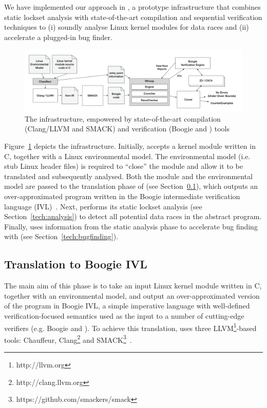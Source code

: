 We have implemented our approach in \whoop, a prototype infrastructure that combines static lockset analysis with state-of-the-art compilation and sequential verification techniques to (i) soundly analyse Linux kernel modules for data races and (ii) accelerate a plugged-in bug finder.

\begin{figure}
\centering
\includegraphics[width=.99\linewidth]{img/whoop.pdf}
\caption{The \whoop infrastructure, empowered by state-of-the-art compilation (Clang/LLVM and SMACK) and verification (Boogie and \corral) tools}
\label{fig:whoop}
\end{figure}

Figure~\ref{fig:whoop} depicts the \whoop infrastructure. Initially, \whoop accepts a kernel module written in C, together with a Linux environmental model. The environmental model (i.e. stub Linux header files) is required to ``close'' the module and allow it to be translated and subsequently analysed. Both the module and the environmental model are passed to the translation phase of \whoop (see Section~\ref{tech:translation}), which outputs an over-approximated program written in the Boogie intermediate verification language (IVL)~\cite{deline2005boogiepl}. Next, \whoop performs its static lockset analysis (see Section~\ref{tech:analysis}) to detect all potential data races in the abstract program. Finally, \whoop uses information from the static analysis phase to accelerate bug finding with \corral (see Section~\ref{tech:bugfinding}).

\subsection{Translation to Boogie IVL}
\label{tech:translation}

The main aim of this phase is to take an input Linux kernel module written in C, together with an environmental model, and output an over-approximated version of the program in Boogie IVL, a simple imperative language with well-defined verification-focused semantics used as the input to a number of cutting-edge verifiers (e.g. Boogie and \corral). To achieve this translation, \whoop uses three LLVM\footnote{http://llvm.org}-based tools: Chauffeur, Clang\footnote{http://clang.llvm.org} and SMACK\footnote{https://github.com/smackers/smack}~\cite{rakamaric2014smack}.

